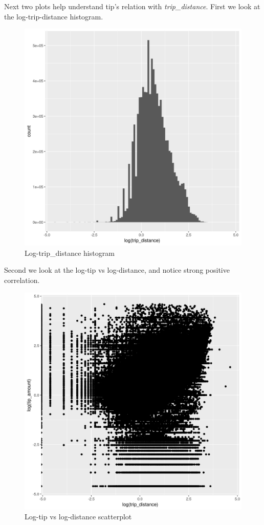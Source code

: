 \documentclass[11pt]{article}
\begin{document}
Next two plots help understand tip's relation with \emph{trip\_distance}.
First we look at the log-trip-distance histogram.
\begin{figure}[htbp]
\centering
\includegraphics[width=.9\linewidth]{./plots/logTripDistanceHist.jpg}
\caption{\label{fig:org63159d1}
Log-trip\_distance histogram}
\end{figure}

Second we look at the log-tip vs log-distance, and notice strong
positive correlation.
\begin{figure}[htbp]
\centering
\includegraphics[width=.9\linewidth]{./plots/distanceTipPlot.jpg}
\caption{\label{fig:org624efc3}
Log-tip vs log-distance scatterplot}
\end{figure}
\end{document}
